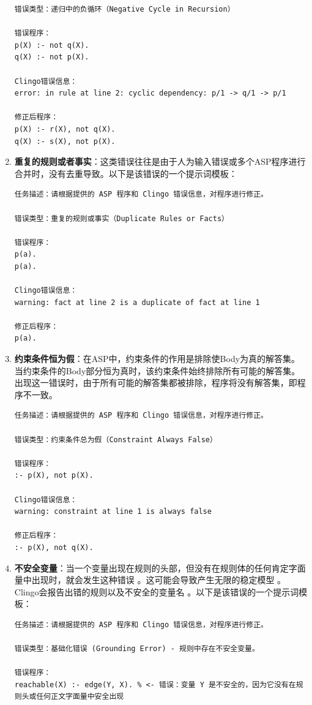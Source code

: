 \begin{enumerate}[nosep]
\begin{lstlisting}
错误类型：​递归中的负循环（Negative Cycle in Recursion）​

错误程序：
p(X) :- not q(X).
q(X) :- not p(X).

Clingo错误信息：
error: in rule at line 2: cyclic dependency: p/1 -> q/1 -> p/1

修正后程序：
p(X) :- r(X), not q(X).
q(X) :- s(X), not p(X).
\end{lstlisting}
\item \textbf{重复的规则或者事实}：这类错误往往是由于人为输入错误或多个ASP程序进行合并时，没有去重导致。以下是该错误的一个提示词模板：
\begin{lstlisting}
任务描述：请根据提供的 ASP 程序和 Clingo 错误信息，对程序进行修正。

错误类型：​重复的规则或事实（Duplicate Rules or Facts）​

错误程序：
p(a).
p(a).

Clingo错误信息：
warning: fact at line 2 is a duplicate of fact at line 1

修正后程序：
p(a).
\end{lstlisting}
\item \textbf{约束条件恒为假}：在ASP中，约束条件的作用是排除使Body为真的解答集。
当约束条件的Body部分恒为真时，该约束条件始终排除所有可能的解答集。出现这一错误时，由于所有可能的解答集都被排除，程序将没有解答集，即程序不一致。
\begin{lstlisting}
任务描述：请根据提供的 ASP 程序和 Clingo 错误信息，对程序进行修正。

错误类型：​约束条件总为假（Constraint Always False）

错误程序：
:- p(X), not p(X).

Clingo错误信息：
warning: constraint at line 1 is always false

修正后程序：
:- p(X), not q(X).
\end{lstlisting}
\item \textbf{不安全变量}：当一个变量出现在规则的头部，但没有在规则体的任何肯定字面量中出现时，就会发生这种错误 。这可能会导致产生无限的稳定模型 。Clingo会报告出错的规则以及不安全的变量名 。以下是该错误的一个提示词模板：
\begin{lstlisting}
任务描述：请根据提供的 ASP 程序和 Clingo 错误信息，对程序进行修正。

错误类型：基础化错误 (Grounding Error) - 规则中存在不安全变量。

错误程序：
reachable(X) :- edge(Y, X). % <- 错误：变量 Y 是不安全的，因为它没有在规则头或任何正文字面量中安全出现


\end{lstlisting}
\end{enumerate}
